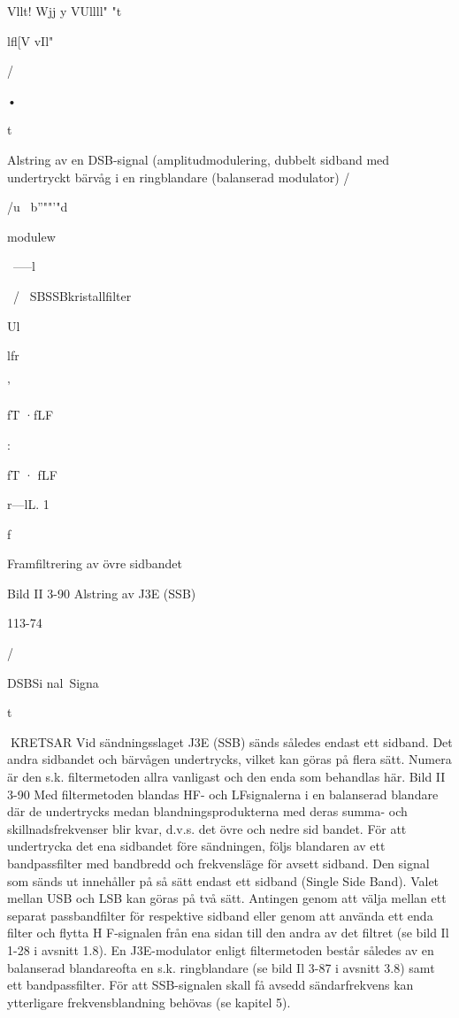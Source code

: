 Vllt! Wjj y VUllll" "t{lfl[V vIl"

/

•

t

Alstring av en DSB-signal (amplitudmodulering, dubbelt sidband med undertryckt bärvåg
i en ringblandare (balanserad modulator)
/

/u~
b''""'"d

modulew

~-----l

~/ ~SBSSBkristallfilter

Ul

lfr

'

fT ·fLF

:

fT · fLF

r---lL. 1

f

Framfiltrering av övre sidbandet

Bild II 3-90 Alstring av J3E (SSB)

113-74

/

DSBSi nal~Signa~

t

KRETSAR
Vid sändningsslaget J3E (SSB) sänds
således endast ett sidband. Det andra sidbandet och bärvågen undertrycks, vilket kan
göras på flera sätt. Numera är den s.k.
filtermetoden allra vanligast och den enda
som behandlas här.
Bild II 3-90
Med filtermetoden blandas HF- och LFsignalerna i en balanserad blandare där de
undertrycks medan blandningsprodukterna
med deras summa- och skillnadsfrekvenser
blir kvar, d.v.s. det övre och nedre sid bandet.
För att undertrycka det ena sidbandet
före sändningen, följs blandaren av ett bandpassfilter med bandbredd och frekvensläge
för avsett sidband. Den signal som sänds ut
innehåller på så sätt endast ett sidband
(Single Side Band).
Valet mellan USB och LSB kan göras på
två sätt. Antingen genom att välja mellan ett
separat passbandfilter för respektive sidband eller genom att använda ett enda filter
och flytta H F-signalen från ena sidan till den
andra av det filtret (se bild Il 1-28 i avsnitt
1.8).
En J3E-modulator enligt filtermetoden
består således av en balanserad blandareofta en s.k. ringblandare (se bild Il 3-87 i
avsnitt 3.8) samt ett bandpassfilter.
För att SSB-signalen skall få avsedd sändarfrekvens kan ytterligare frekvensblandning behövas (se kapitel 5).

}
